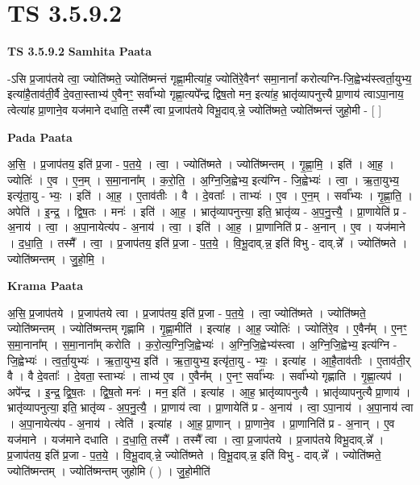 \documentclass[17pt]{extarticle}
\begin{document}
\section{ TS 3.5.9.2 }

\textbf{TS 3.5.9.2 } \newline
\textbf{Samhita Paata} \newline

-ऽसि प्र॒जाप॑तये त्वा॒ ज्योति॑ष्मते॒ ज्योति॑ष्मन्तं गृह्णा॒मीत्या॑ह॒ ज्योति॑रे॒वैनꣳ॑ समा॒नानां᳚ करोत्यग्नि-जि॒ह्वेभ्य॑स्त्वर्ता॒युभ्य॒ इत्या॑है॒ताव॑ती॒र्वै दे॒वता॒स्ताभ्य॑ ए॒वैनꣳ॒॒ सर्वा᳚भ्यो गृह्णा॒त्यपे᳚न्द्र द्विष॒तो मन॒ इत्या॑ह॒ भ्रातृ॑व्यापनुत्त्यै प्रा॒णाय॑ त्वाऽपा॒नाय॒ त्वेत्या॑ह प्रा॒णाने॒व यज॑माने दधाति॒ तस्मै᳚ त्वा प्र॒जाप॑तये विभू॒दाव्.न्ने॒ ज्योति॑ष्मते॒ ज्योति॑ष्मन्तं जुहो॒मी - [  ] \newline

\textbf{Pada Paata} \newline

अ॒सि॒ । प्र॒जाप॑तय॒ इति॑ प्र॒जा - प॒त॒ये॒ । त्वा॒ । ज्योति॑ष्मते । ज्योति॑ष्मन्तम् । गृ॒ह्णा॒मि॒ । इति॑ । आ॒ह॒ । ज्योतिः॑ । ए॒व । ए॒न॒म् । स॒मा॒नाना᳚म् । क॒रो॒ति॒ । अ॒ग्नि॒जि॒ह्वेभ्य॒ इत्य॑ग्नि - जि॒ह्वेभ्यः॑ । त्वा॒ । ऋ॒ता॒युभ्य॒ इत्यृ॑ता॒यु - भ्यः॒ । इति॑ । आ॒ह॒ । ए॒ताव॑तीः । वै । दे॒वताः᳚ । ताभ्यः॑ । ए॒व । ए॒न॒म् । सर्वा᳚भ्यः । गृ॒ह्णा॒ति॒ । अपेति॑ । इ॒न्द्र॒ । द्वि॒ष॒तः । मनः॑ । इति॑ । आ॒ह॒ । भ्रातृ॑व्यापनुत्त्या॒ इति॒ भ्रातृ॑व्य - अ॒प॒नु॒त्त्यै॒ । प्रा॒णायेति॑ प्र - अ॒नाय॑ । त्वा॒ । अ॒पा॒नायेत्य॑प - अ॒नाय॑ । त्वा॒ । इति॑ । आ॒ह॒ । प्रा॒णानिति॑ प्र - अ॒नान् । ए॒व । यज॑माने । द॒धा॒ति॒ । तस्मै᳚ । त्वा॒ । प्र॒जाप॑तय॒ इति॑ प्र॒जा - प॒त॒ये॒ । वि॒भू॒दाव्.न्न॒ इति॑ विभु - दाव्.न्ने᳚ । ज्योति॑ष्मते । ज्योति॑ष्मन्तम् । जु॒हो॒मि॒ ।  \newline


\textbf{Krama Paata} \newline

अ॒सि॒ प्र॒जाप॑तये । प्र॒जाप॑तये त्वा । प्र॒जाप॑तय॒ इति॑ प्र॒जा - प॒त॒ये॒ । त्वा॒ ज्योति॑ष्मते । ज्योति॑ष्मते॒ ज्योति॑ष्मन्तम् । ज्योति॑ष्मन्तम् गृह्णामि । गृ॒ह्णा॒मीति॑ । इत्या॑ह । आ॒ह॒ ज्योतिः॑ । ज्योति॑रे॒व । ए॒वैन᳚म् । ए॒नꣳ॒॒ स॒मा॒नाना᳚म् । स॒मा॒नाना᳚म् करोति । क॒रो॒त्य॒ग्नि॒जि॒ह्वेभ्यः॑ । अ॒ग्नि॒जि॒ह्वेभ्य॑स्त्वा । अ॒ग्नि॒जि॒ह्वेभ्य॒ इत्य॑ग्नि - जि॒ह्वेभ्यः॑ । त्व॒र्ता॒युभ्यः॑ । ऋ॒ता॒युभ्य॒ इति॑ । ऋ॒ता॒युभ्य॒ इत्यृ॑ता॒यु - भ्यः॒ । इत्या॑ह । आ॒है॒ताव॑तीः । ए॒ताव॑ती॒र् वै । वै दे॒वताः᳚ । दे॒वता॒ स्ताभ्यः॑ । ताभ्य॑ ए॒व । ए॒वैन᳚म् । ए॒नꣳ॒॒ सर्वा᳚भ्यः । सर्वा᳚भ्यो गृह्णाति । गृ॒ह्णा॒त्यप॑ । अपे᳚न्द्र । इ॒न्द्र॒ द्वि॒ष॒तः । द्वि॒ष॒तो मनः॑ । मन॒ इति॑ । इत्या॑ह । आ॒ह॒ भ्रातृ॑व्यापनुत्यै । भ्रातृ॑व्यापनुत्यै प्रा॒णाय॑ । भ्रातृ॑व्यापनुत्या॒ इति॒ भ्रातृ॑व्य - अ॒प॒नु॒त्यै॒ । प्रा॒णाय॑ त्वा । प्रा॒णायेति॑ प्र - अ॒नाय॑ । त्वा॒ ऽपा॒नाय॑ । अ॒पा॒नाय॑ त्वा । अ॒पा॒नायेत्य॑प - अ॒नाय॑ । त्वेति॑ । इत्या॑ह । आ॒ह॒ प्रा॒णान् । प्रा॒णाने॒व । प्रा॒णानिति॑ प्र - अ॒नान् । ए॒व यज॑माने । यज॑माने दधाति । द॒धा॒ति॒ तस्मै᳚ । तस्मै᳚ त्वा । त्वा॒ प्र॒जाप॑तये । प्र॒जाप॑तये विभू॒दाव्.न्ने᳚ । प्र॒जाप॑तय॒ इति॑ प्र॒जा - प॒त॒ये॒ । वि॒भू॒दाव्.न्ने॒ ज्योति॑ष्मते । वि॒भू॒दाव्.न्न॒ इति॑ विभु - दाव्.न्ने᳚ । ज्योति॑ष्मते॒ ज्योति॑ष्मन्तम् । ज्योति॑ष्मन्तम् जुहोमि ( ) । जु॒हो॒मीति॑ \newline
\end{document}
